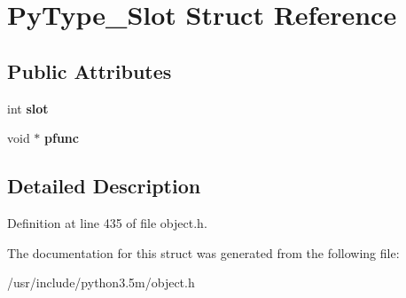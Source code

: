 \hypertarget{structPyType__Slot}{}\section{Py\+Type\+\_\+\+Slot Struct Reference}
\label{structPyType__Slot}
\subsection*{Public Attributes}
\begin{DoxyCompactItemize}
\item 
int {\bfseries slot}\hypertarget{structPyType__Slot_a72275647f4f13143d4ba91ee094f04d9}{}\label{structPyType__Slot_a72275647f4f13143d4ba91ee094f04d9}

\item 
void $\ast$ {\bfseries pfunc}\hypertarget{structPyType__Slot_ae1095a0440938ccb92f0495af86c1016}{}\label{structPyType__Slot_ae1095a0440938ccb92f0495af86c1016}

\end{DoxyCompactItemize}


\subsection{Detailed Description}


Definition at line 435 of file object.\+h.



The documentation for this struct was generated from the following file\+:\begin{DoxyCompactItemize}
\item 
/usr/include/python3.\+5m/object.\+h\end{DoxyCompactItemize}
